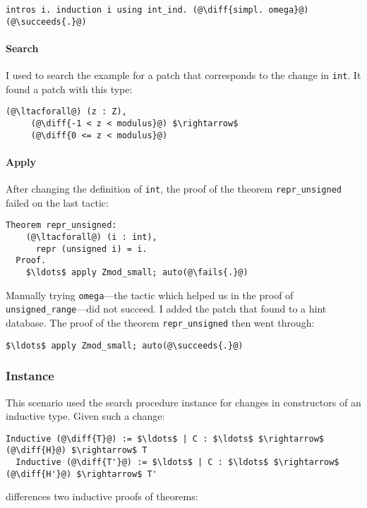 \begin{lstlisting}[language=coq]
    intros i. induction i using int_ind. (@\diff{simpl. omega}@)(@\succeeds{.}@)
\end{lstlisting}

\paragraph{Search} I used \sysname to search the example for a patch that corresponds to the change in \lstinline{int}. It found
a patch with this type:

\begin{lstlisting}[language=coq]
   (@\ltacforall@) (z : Z),
     (@\diff{-1 < z < modulus}@) $\rightarrow$
     (@\diff{0 <= z < modulus}@)
\end{lstlisting}

\paragraph{Apply} After changing the definition of \lstinline{int}, the proof of the
theorem \lstinline{repr_unsigned} failed on the last tactic:

\begin{lstlisting}[language=coq]
  Theorem repr_unsigned:
    (@\ltacforall@) (i : int),
      repr (unsigned i) = i.
  Proof.
    $\ldots$ apply Zmod_small; auto(@\fails{.}@)
\end{lstlisting}
Manually trying \lstinline{omega}---the tactic which helped us in the proof of \lstinline{unsigned_range}---did not
succeed.
I added the patch that \sysname found to a hint database.
The proof of the theorem \lstinline{repr_unsigned} then went through:

\begin{lstlisting}[language=coq]
  $\ldots$ apply Zmod_small; auto(@\succeeds{.}@)
\end{lstlisting}

\subsubsection*{Instance}

This scenario used the search procedure instance for changes in constructors of an inductive type.
Given such a change:

\begin{lstlisting}[language=coq]
  Inductive (@\diff{T}@) := $\ldots$ | C : $\ldots$ $\rightarrow$ (@\diff{H}@) $\rightarrow$ T
  Inductive (@\diff{T'}@) := $\ldots$ | C : $\ldots$ $\rightarrow$ (@\diff{H'}@) $\rightarrow$ T'
\end{lstlisting}
\sysname differences two inductive proofs of theorems:

